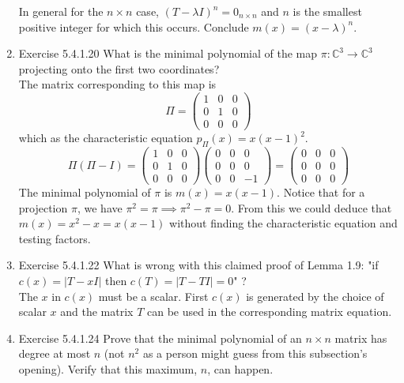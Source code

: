 \documentclass[a4paper]{article}
\begin{document}
\begin{enumerate}
In general for the $n\times n$ case, $(T-\lambda I)^n = 0_{n\times n}$ and $n$ is the smallest positive integer for which this occurs. Conclude $m(x) = (x-\lambda)^n$. 

\item{Exercise 5.4.1.20} What is the minimal polynomial of the map $\pi : \mathbb{C}^3 \rightarrow \mathbb{C}^3$ projecting onto the first two coordinates? \\

The matrix corresponding to this map is
$$\Pi = \begin{pmatrix}
1 & 0 & 0 \\ 0 & 1 & 0 \\ 0 & 0 & 0 
\end{pmatrix}
$$
which as the characteristic equation $p_{\Pi}(x) = x(x-1)^2$.
$$
\Pi ( \Pi - I) =
\begin{pmatrix}
1 & 0 & 0 \\ 0 & 1 & 0 \\ 0 & 0 & 0 
\end{pmatrix}
\begin{pmatrix}
0 & 0 & 0 \\ 0 & 0 & 0 \\ 0 & 0 & -1 
\end{pmatrix}  =
\begin{pmatrix}
0 & 0 & 0 \\ 0 & 0 & 0 \\ 0 & 0 & 0 
\end{pmatrix}
$$
The minimal polynomial of $\pi$ is $m(x) = x(x-1)$. Notice that for a projection $\pi$, we have $\pi^2 = \pi \implies \pi^2 - \pi = 0$. From this we could deduce that $m(x) = x^2 - x = x(x-1)$ without finding the characteristic equation and testing factors.

\item{Exercise 5.4.1.22} What is wrong with this claimed proof of Lemma 1.9: "if $c(x) = |T − xI|$ then $c(T) = |T − T I| = 0$" ? \\

The $x$ in $c(x)$ must be a scalar. First $c(x)$ is generated by the choice of scalar $x$ and the matrix $T$ can be used in the corresponding matrix equation. 

\item{Exercise 5.4.1.24} Prove that the minimal polynomial of an $n\times n$ matrix has degree at most $n$ (not $n^2$ as a person might guess from this subsection's opening). Verify that this
maximum, $n$, can happen. \\


\end{enumerate}
\end{document}
